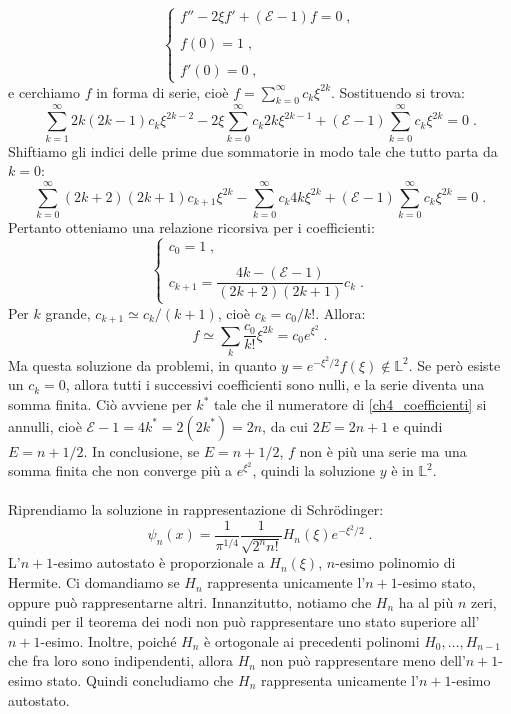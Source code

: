\documentclass[10pt,a4paper]{report}
\theoremstyle{definition}
\numberwithin{equation}{section}
\newcommand{\Sch}{Schrödinger}
\begin{document}
\begin{equation}
\begin{cases}
f''-2\xi f'+(\mathcal{E}-1)f=0\;, \\
\\
f(0)=1\;, \\
\\
f'(0)=0\;,
\end{cases}
\end{equation}
e cerchiamo $f$ in forma di serie, cioè $f=\sum_{k=0}^{\infty} c_k\xi^{2k}$. Sostituendo si trova:
$$
\sum_{k=1}^{\infty} 2k(2k-1)c_k\xi^{2k-2}-2\xi\sum_{k=0}^{\infty}c_k 2k\xi^{2k-1}+(\mathcal{E}-1)\sum_{k=0}^{\infty} c_k \xi^{2k}=0\;.
$$
Shiftiamo gli indici delle prime due sommatorie in modo tale che tutto parta da $k=0$:
$$
\sum_{k=0}^{\infty} (2k+2)(2k+1)c_{k+1}\xi^{2k}-\sum_{k=0}^{\infty}c_k 4k\xi^{2k}+(\mathcal{E}-1)\sum_{k=0}^{\infty} c_k\xi^{2k}=0\;.
$$
Pertanto otteniamo una relazione ricorsiva per i coefficienti:
\begin{equation}
\begin{cases}
c_0=1\;, \\
\\
c_{k+1}=\dfrac{4k-(\mathcal{E}-1)}{(2k+2)(2k+1)}c_k\;.
\end{cases} \label{ch4_coefficienti}
\end{equation}
Per $k$ grande, $c_{k+1}\simeq c_k/(k+1)$, cioè $c_k=c_0/k!$. Allora:
$$
f\simeq \sum_k \frac{c_0}{k!}\xi^{2k}=c_0e^{\xi^2}\;.
$$
Ma questa soluzione da problemi, in quanto $y=e^{-\xi^2/2}f(\xi)\not\in\mathbb{L}^2$. Se però esiste un $c_k=0$, allora tutti i successivi coefficienti sono nulli, e la serie diventa una somma finita. Ciò avviene per $k^*$ tale che il numeratore di \eqref{ch4_coefficienti} si annulli, cioè $\mathcal{E}-1=4k^*=2(2k^*)=2n$, da cui $2E=2n+1$ e quindi $E=n+1/2$. In conclusione, se $E=n+1/2$, $f$ non è più una serie ma una somma finita che non converge più a $e^{\xi^2}$, quindi la soluzione $y$ è in $\mathbb{L}^2$. \\
\\
Riprendiamo la soluzione in rappresentazione di \Sch:
\begin{equation}
\psi_n(x)=\frac{1}{\pi^{1/4}}\frac{1}{\sqrt{2^n n!}}H_n(\xi)e^{-\xi^2/2}\;.
\end{equation}
L'$n+1$-esimo autostato è proporzionale a $H_n(\xi)$, $n$-esimo polinomio di Hermite. Ci domandiamo se $H_n$ rappresenta unicamente l'$n+1$-esimo stato, oppure può rappresentarne altri. Innanzitutto, notiamo che $H_n$ ha al più $n$ zeri, quindi per il teorema dei nodi non può rappresentare uno stato superiore all'$n+1$-esimo. Inoltre, poiché $H_n$ è ortogonale ai precedenti polinomi $H_0,\ldots,H_{n-1}$ che fra loro sono indipendenti, allora $H_n$ non può rappresentare meno dell'$n+1$-esimo stato. Quindi concludiamo che $H_n$ rappresenta unicamente l'$n+1$-esimo autostato. \\
\end{document}
